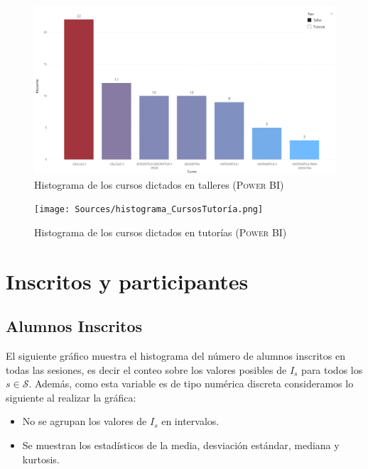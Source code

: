 \documentclass[11pt,a4paper]{book}
\theoremstyle{definition}%
\begin{document}
                \begin{figure}[H]
                    \centering
                    \includegraphics[width=1\textwidth]{Sources/histograma_CursosTaller.png}
                    \caption{Histograma de los cursos dictados en talleres (\textsc{Power BI})}
                    \label{fig:histograma_CursosTaller}
                \end{figure}
                \begin{figure}[H]
                    \centering
                    \texttt{[image: Sources/histograma\_CursosTutoría.png]}
                    \caption{Histograma de los cursos dictados en tutorías (\textsc{Power BI})}
                    \label{fig:histograma_CursosTutoría}
                \end{figure}
            \newpage
            \section{Inscritos y participantes}
                \subsection{Alumnos Inscritos}                
                
                    El siguiente gráfico muestra el histograma del número de alumnos inscritos en todas las sesiones, es decir el conteo sobre los valores posibles de $I_s$ para todos los $s\in\mathcal{S}$. Además, como esta variable es de tipo numérica discreta consideramos lo siguiente al realizar la gráfica:
                    \begin{itemize}
                        \item No se agrupan los valores de $I_s$ en intervalos.
                        \item Se muestran los estadísticos de la media, desviación estándar, mediana y kurtosis.
                    \end{itemize}
                    
\end{document}
